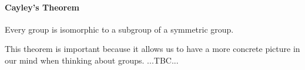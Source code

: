 
\paragraph{Cayley's Theorem} Every group is isomorphic to a subgroup of a symmetric group.

\medskip
This theorem is important because it allows us to have a more concrete picture in our mind when thinking about groups. ...TBC...



